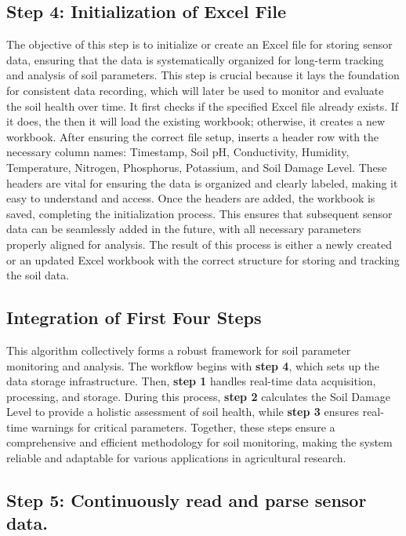 \documentclass{book} %
\begin{document}
\noindent 
\subsection{Step 4: Initialization of Excel File}

\noindent The objective of this step is to initialize or create an Excel file for storing sensor data, ensuring that the data is systematically organized for long-term tracking and analysis of soil parameters. This step is crucial because it lays the foundation for consistent data recording, which will later be used to monitor and evaluate the soil health over time. It first checks if the specified Excel file already exists. If it does, the then it will load the existing workbook; otherwise, it creates a new workbook. After ensuring the correct file setup, inserts a header row with the necessary column names: Timestamp, Soil pH, Conductivity, Humidity, Temperature, Nitrogen, Phosphorus, Potassium, and Soil Damage Level. These headers are vital for ensuring the data is organized and clearly labeled, making it easy to understand and access. Once the headers are added, the workbook is saved, completing the initialization process. This ensures that subsequent sensor data can be seamlessly added in the future, with all necessary parameters properly aligned for analysis. The result of this process is either a newly created or an updated Excel workbook with the correct structure for storing and tracking the soil data.\textbf{}

\noindent 
\subsection{Integration of First Four Steps}

\noindent This algorithm collectively forms a robust framework for soil parameter monitoring and analysis. The workflow begins with \textbf{step 4}, which sets up the data storage infrastructure. Then, \textbf{step 1} handles real-time data acquisition, processing, and storage. During this process, \textbf{step 2} calculates the Soil Damage Level to provide a holistic assessment of soil health, while \textbf{step 3} ensures real-time warnings for critical parameters. Together, these steps ensure a comprehensive and efficient methodology for soil monitoring, making the system reliable and adaptable for various applications in agricultural research.\textbf{}

\noindent 
\subsection{Step 5: Continuously read and parse sensor data.}
\end{document}
